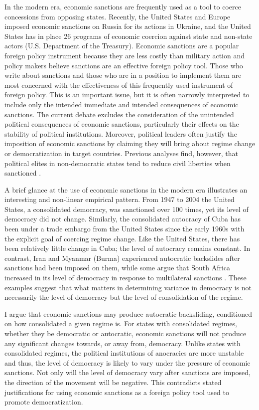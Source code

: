 \documentclass[a4paper]{article}\usepackage[]{graphicx}\usepackage[]{color}
\begin{document}
In the modern era, economic sanctions are frequently used as a tool to coerce concessions from opposing states. Recently, the United States and Europe imposed economic sanctions on Russia for its actions in Ukraine, and the United States has in place 26 programs of economic coercion against state and non-state actors (U.S. Department of the Treasury). Economic sanctions are a popular foreign policy instrument because they are less costly than military action and policy makers believe sanctions are an effective foreign policy tool. Those who write about sanctions and those who are in a position to implement them are most concerned with the effectiveness of this frequently used instrument of foreign policy. This is an important issue, but it is often narrowly interpreted to include only the intended immediate and intended consequences of economic sanctions. The current debate excludes the consideration of the unintended political consequences of economic sanctions, particularly their effects on the stability of political institutions. Moreover, political leaders often justify the imposition of economic sanctions by claiming they will bring about regime change or democratization in target countries. Previous analyses find, however, that political elites in non-democratic states tend to reduce civil liberties when sanctioned \citep{cingranelli2010cingranelli, wood2008hand, peksen2009better, peksen2009economic, pdeksen2010coercive, peksen2010coercive}. 
\par
A brief glance at the use of economic sanctions in the modern era illustrates an interesting and non-linear empirical pattern. From 1947 to 2004 the United States, a consolidated democracy, was sanctioned over 100 times, yet its level of democracy did not change. Similarly, the consolidated autocracy of Cuba has been under a trade embargo from the United States since the early 1960s with the explicit goal of coercing regime change. Like the United States, there has been relatively little change in Cuba; the level of autocracy remains constant. In contrast, Iran and Myanmar (Burma) experienced autocratic backslides after sanctions had been imposed on them, while some argue that South Africa increased in its level of democracy in response to multilateral sanctions \citep{klotz1995norms}. These examples suggest that what matters in determining variance in democracy is not necessarily the level of democracy but the level of consolidation of the regime.  
\par
I argue that economic sanctions may produce autocratic backsliding, conditioned on how consolidated a given regime is. For states with consolidated regimes, whether they be democratic or autocratic, economic sanctions will not produce any significant changes towards, or away from, democracy. Unlike states with consolidated regimes, the political institutions of anocracies are more unstable and thus, the level of democracy is likely to vary under the pressure of economic sanctions. Not only will the level of democracy vary after sanctions are imposed, the direction of the movement will be negative. This contradicts stated justifications for using economic sanctions as a foreign policy tool used to promote democratization.  
\end{document}
